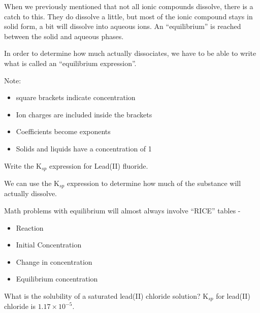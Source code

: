\documentclass[../hchem.tex]{subfiles}
\begin{document}
When we previously mentioned that not all ionic compounds dissolve, there is a catch to this.
They do dissolve a little, but most of the ionic compound stays in solid form, a bit will dissolve into aqueous ions.
An ``equilibrium'' is reached between the solid and aqueous phases.

In order to determine how much actually dissociates, we have to be able to write what is called an ``equilibrium expression''.

Note:
\begin{itemize}
    \item square brackets indicate concentration 
    \item Ion charges are included inside the brackets 
    \item Coefficients become exponents 
    \item Solids and liquids have a concentration of 1
\end{itemize}

\ex Write the K$_{sp}$ expression for Lead(II) fluoride.

We can use the K$_{sp}$ expression to determine how much of the substance will actually dissolve.

Math problems with equilibrium will almost always involve ``RICE'' tables - 
\begin{itemize}
    \item Reaction 
    \item Initial Concentration
    \item Change in concentration
    \item Equilibrium concentration
\end{itemize}

\ex What is the solubility of a saturated lead(II) chloride solution? K$_{sp}$ for lead(II) chloride is $1.17\times 10^{-5}$. 
\end{document}
